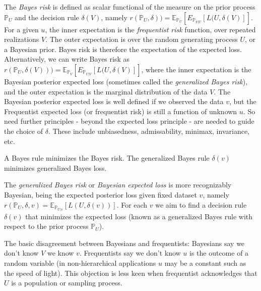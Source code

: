 \documentclass{article}
\begin{document}
The \textit{Bayes risk}  is defined as scalar functional of the measure on the prior process $\mathbb{P}_U$ and the decision rule $\delta(V)$, namely $r(\mathbb{P}_U,\delta))=\mathbb{E}_{\mathbb{P}_U}[E_{\mathbb{P}_{V|U}}[L(U,\delta(V)]]$. For a given $u$, the inner expectation is the \textit{frequentist risk} function, over repeated realizations $V$. The outer expectation is over the random generating process $U$, or a Bayesian prior. Bayes risk is therefore the expectation of the expected loss. Alternatively, we can write Bayes risk as $r(\mathbb{P}_U,\delta(V)))=\mathbb{E}_{\mathbb{P}_V}[E_{\mathbb{P}_{U|V}}[L(U,\delta(V)]]$, where the inner expectation is the Bayesian posterior expected loss (sometimes called the \textit{generalized Bayes risk}), and the outer expectation is the marginal distribution of the data $V$. The Bayesian posterior expected loss is well defined if we observed the data $v$, but the Frequentist expected loss (or frequentist risk) is still a function of unknown $u$. So need further principles - beyond the expected loss principle - are needed to guide the choice of $\delta$. These include unbiasedness, admissability, minimax, invariance, etc.

A Bayes rule minimizes the Bayes risk. The generalized Bayes rule $\delta(v)$ minimizes generalized Bayes loss.

The \textit{generalized Bayes risk} or \textit{Bayesian expected loss} is more recognizably Bayesian, being the expected posterior loss given fixed dataset $v$, namely  $r(\mathbb{P}_U,\delta, v) = \mathbb{E}_{\mathbb{P}_{U|v}}[L(U,\delta(v))]$.
For each $v$ we aim to find a decision rule $\delta(v)$ that minimizes the expected loss (known as a generalized Bayes rule with respect to the prior process $\mathbb{P}_U$).

The basic disagreement between Bayesians and frequentists: Bayesians say we don't know $V$ we know $v$. Frequentists say we don't know $u$ is the outcome of a random variable (in non-hierarchical applications $u$ may be a constant such as the speed of light). This objection is less keen when frequentist acknowledges that $U$ is a population or sampling process.
\end{document}
